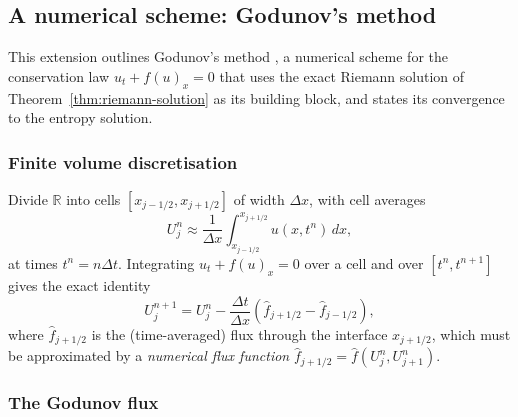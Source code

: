 
\subsection{A numerical scheme: Godunov's method}
\label{subsec:godunov}

This extension outlines Godunov's method \cite{godunov1959}, a numerical
scheme for the conservation law
$u_t+f(u)_x=0$ that uses the exact Riemann solution of
Theorem~\ref{thm:riemann-solution} as its building block, and states its
convergence to the entropy solution.

\subsubsection{Finite volume discretisation}
\label{subsubsec:finite-volume}

Divide $\mathbb{R}$ into cells $[x_{j-1/2}, x_{j+1/2}]$ of width $\Delta
x$, with cell averages
\begin{equation}
  U_j^n \approx \frac{1}{\Delta x}\int_{x_{j-1/2}}^{x_{j+1/2}} u(x, t^n)\, dx,
\end{equation}
at times $t^n = n\Delta t$. Integrating $u_t+f(u)_x=0$ over a cell and
over $[t^n,t^{n+1}]$ gives the exact identity
\begin{equation}
  U_j^{n+1} = U_j^n - \frac{\Delta t}{\Delta x}
  \left( \widehat{f}_{j+1/2} - \widehat{f}_{j-1/2} \right),
\end{equation}
where $\widehat f_{j+1/2}$ is the (time-averaged) flux through the
interface $x_{j+1/2}$, which must be approximated by a \emph{numerical
flux function} $\widehat f_{j+1/2} = \widehat f(U_j^n, U_{j+1}^n)$.

\subsubsection{The Godunov flux}
\label{subsubsec:godunov-flux}

